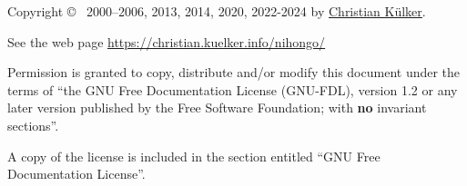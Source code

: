 \footnotesize

Copyright \copyright~ 2000–2006, 2013, 2014, 2020, 2022-2024 by
\href{mailto:christian.kuelker@cipworx.org}{Christian K\"ulker}.

\medskip

See the web page
\href{https://christian.kuelker.info/nihongo/}{https://christian.kuelker.info/nihongo/}


Permission is granted to copy, distribute and/or modify this document under the
terms of “the GNU Free Documentation License (GNU-FDL), version 1.2 or any
later version published by the Free Software Foundation; with \textbf{no}
invariant sections”.

A copy of the license is included in the section entitled “GNU Free
Documentation License”.

\normalsize
